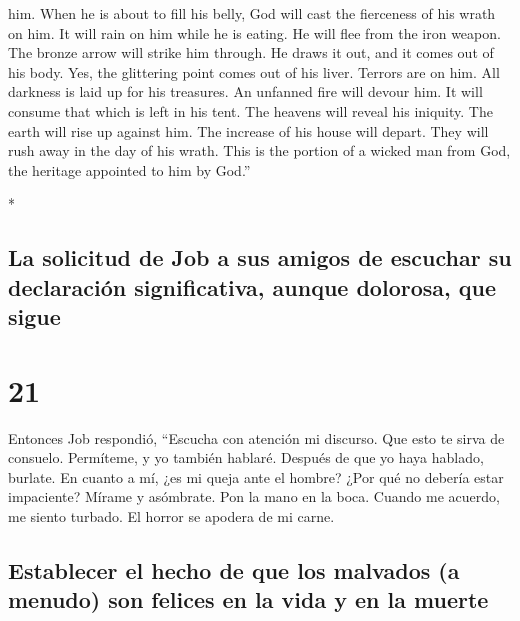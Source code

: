 \begin{paracol}{2}
\begin{otherlanguage}{english}
him.  When he is about to fill his belly, God will cast
the fierceness of his wrath on him. It will rain on him while he is
eating.  He will flee from the iron weapon. The bronze
arrow will strike him through.  He draws it out, and it
comes out of his body. Yes, the glittering point comes out of his liver.
Terrors are on him.  All darkness is laid up for his
treasures. An unfanned fire will devour him. It will consume that which
is left in his tent.  The heavens will reveal his
iniquity. The earth will rise up against him.  The
increase of his house will depart. They will rush away in the day of his
wrath.  This is the portion of a wicked man from God, the
heritage appointed to him by God.''

\end{otherlanguage}

\switchcolumn[0]*

\hypertarget{la-solicitud-de-job-a-sus-amigos-de-escuchar-su-declaraciuxf3n-significativa-aunque-dolorosa-que-sigue}{%
\subsection{La solicitud de Job a sus amigos de escuchar su declaración
significativa, aunque dolorosa, que
sigue}\label{la-solicitud-de-job-a-sus-amigos-de-escuchar-su-declaraciuxf3n-significativa-aunque-dolorosa-que-sigue}}

\hypertarget{section-40}{%
\section{21}\label{section-40}}

 Entonces Job respondió,  ``Escucha con
atención mi discurso. Que esto te sirva de consuelo. 
Permíteme, y yo también hablaré. Después de que yo haya hablado,
burlate.  En cuanto a mí, ¿es mi queja ante el hombre?
¿Por qué no debería estar impaciente?  Mírame y asómbrate.
Pon la mano en la boca.  Cuando me acuerdo, me siento
turbado. El horror se apodera de mi carne.

\hypertarget{establecer-el-hecho-de-que-los-malvados-a-menudo-son-felices-en-la-vida-y-en-la-muerte}{%
\subsection{Establecer el hecho de que los malvados (a menudo) son
felices en la vida y en la
muerte}\label{establecer-el-hecho-de-que-los-malvados-a-menudo-son-felices-en-la-vida-y-en-la-muerte}}


\end{paracol}
